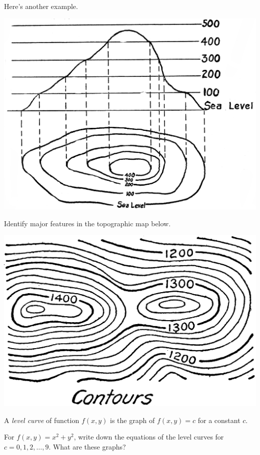 Here's another example.
\begin{center}
    \includegraphics[width=.6\textwidth]{images/topo-map.png}\label{img:fcit-page-2}
\end{center}
\begin{ex}
    Identify major features in the topographic map below.
\end{ex}

\vfill

\begin{center}
    \includegraphics[width=.8\textwidth]{images/topo-map2.png}
\end{center}
\vfill\mbox{} 

\pagebreak 

\begin{defn}
    A \emph{level curve} of function $f(x,y)$ is the graph of $f(x,y)=c$ for a constant $c$.
\end{defn}
\begin{ex}\label{ex:elliptic-paraboloid}
    For $f(x,y)=x^2+y^2$, write down the equations of the level curves for $c=0,1,2,\dots,9$. What are these graphs?
\end{ex}
\vfill 

